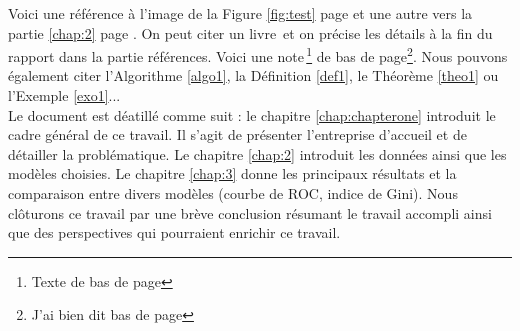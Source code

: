 

%
%


Voici une référence à l'image de la Figure \ref{fig:test} page \pageref{fig:test} et une autre vers la partie \ref{chap:2} page \pageref{chap:2}.
On peut citer un livre\, \cite{caillois1} et on précise les détails à la fin du rapport dans la partie références.
Voici une note\,\footnote{Texte de bas de page} de bas de page\footnote{J'ai bien dit bas de page}. Nous pouvons également citer l'Algorithme \ref{algo1}, la Définition \ref{def1}, le Théorème \ref{theo1} ou l'Exemple \ref{exo1}...\\

Le document est déatillé comme suit : le chapitre \ref{chap:chapterone} introduit le cadre général de ce travail. Il s'agit de présenter l'entreprise d'accueil et de détailler la problématique. Le chapitre \ref{chap:2} introduit les données ainsi que les modèles choisies. Le chapitre \ref{chap:3} donne les principaux résultats et la comparaison entre divers modèles (courbe de ROC, indice de Gini). Nous clôturons ce travail par une brève conclusion résumant le travail accompli ainsi que des perspectives qui pourraient enrichir ce travail.


